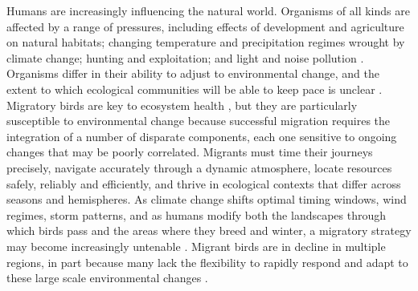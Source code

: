 \documentclass[a4paper, nobind]{templates/ociamthesis}
\begin{document}
Humans are increasingly influencing the natural world. Organisms of all kinds are affected by a range of pressures, including effects of development and agriculture on natural habitats; changing temperature and precipitation regimes wrought by climate change; hunting and exploitation; and light and noise pollution \autocite{gastonEcologicalImpactsNighttime2013,hanskiHabitatLossDynamics2011,mantyka-pringleInteractionsClimateHabitat2012,benitez-lopezImpactHuntingTropical2017,kuncAquaticNoisePollution2016,urbanAcceleratingExtinctionRisk2015}. Organisms differ in their ability to adjust to environmental change, and the extent to which ecological communities will be able to keep pace is unclear \autocite{feeleyAmazonVulnerabilityClimate2012,liangHowDisturbanceCompetition2018,poloczanskaGlobalImprintClimate2013,urbanImprovingForecastBiodiversity2016}. Migratory birds are key to ecosystem health \autocite{bauerMigratoryAnimalsCouple2014}, but they are particularly susceptible to environmental change because successful migration requires the integration of a number of disparate components, each one sensitive to ongoing changes that may be poorly correlated. Migrants must time their journeys precisely, navigate accurately through a dynamic atmosphere, locate resources safely, reliably and efficiently, and thrive in ecological contexts that differ across seasons and hemispheres. As climate change shifts optimal timing windows, wind regimes, storm patterns, and as humans modify both the landscapes through which birds pass and the areas where they breed and winter, a migratory strategy may become increasingly untenable \autocite{wilcoveGoingGoingGone2008,rungeProtectedAreasGlobal2015}. Migrant birds are in decline in multiple regions, in part because many lack the flexibility to rapidly respond and adapt to these large scale environmental changes \autocite{beresfordPhenologyClimateChange2019,bothAvianPopulationConsequences2010,fraserIndividualVariabilityMigration2019,sandersonLongtermPopulationDeclines2006}.
\end{document}
